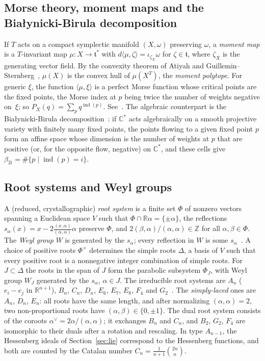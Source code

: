 \documentclass[11pt,a4paper]{article}
\numberwithin{equation}{section}
\theoremstyle{plain}
\theoremstyle{definition}
\theoremstyle{remark}
\newcommand{\R}{\mathbb{R}}
\newcommand{\C}{\mathbb{C}}
\newcommand{\Z}{\mathbb{Z}}
\DeclareMathOperator{\ind}{ind}
\begin{document}
\subsection{Morse theory, moment maps and the Białynicki-Birula decomposition}\label{app:morse}
If $T$ acts on a compact symplectic manifold $(X,\omega)$ preserving $\omega$, a \emph{moment map} is a $T$-invariant map $\mu\colon X\to\mathfrak t^*$ with $d\langle\mu,\zeta\rangle=\iota_{\zeta_X}\omega$ for $\zeta\in\mathfrak t$, where $\zeta_X$ is the generating vector field. By the convexity theorem of Atiyah and Guillemin--Sternberg~\cite{Ati82,GS82}, $\mu(X)$ is the convex hull of $\mu(X^T)$, the \emph{moment polytope}. For generic $\xi$, the function $\langle\mu,\xi\rangle$ is a perfect Morse function whose critical points are the fixed points, the Morse index at $p$ being twice the number of weights negative on~$\xi$; so $P_X(q)=\sum_pq^{\ind(p)}$. See~\cite{CdS01}. The algebraic counterpart is the Białynicki-Birula decomposition~\cite{BB73,Car02}: if $\C^*$ acts algebraically on a smooth projective variety with finitely many fixed points, the points flowing to a given fixed point $p$ form an affine space whose dimension is the number of weights at $p$ that are positive (or, for the opposite flow, negative) on $\C^*$, and these cells give $\beta_{2i}=\#\{p\mid\ind(p)=i\}$.

\subsection{Root systems and Weyl groups}\label{app:roots}
A (reduced, crystallographic) \emph{root system} is a finite set $\Phi$ of nonzero vectors spanning a Euclidean space $V$ such that $\Phi\cap\R\alpha=\{\pm\alpha\}$, the reflections $s_\alpha(x)=x-2\frac{(x,\alpha)}{(\alpha,\alpha)}\alpha$ preserve $\Phi$, and $2(\beta,\alpha)/(\alpha,\alpha)\in\Z$ for all $\alpha,\beta\in\Phi$. The \emph{Weyl group} $W$ is generated by the $s_\alpha$; every reflection in $W$ is some $s_\alpha$~\cite[§1.14]{Hum90}. A choice of positive roots $\Phi^+$ determines the simple roots $\Delta$, a basis of $V$ such that every positive root is a nonnegative integer combination of simple roots. For $J\subset\Delta$ the roots in the span of $J$ form the parabolic subsystem $\Phi_J$, with Weyl group $W_J$ generated by the $s_\alpha$, $\alpha\in J$. The irreducible root systems are $A_n$ ($e_i-e_j$ in $\R^{n+1}$), $B_n$, $C_n$, $D_n$, $E_6$, $E_7$, $E_8$, $F_4$ and $G_2$~\cite{Hum90}. The \emph{simply-laced} ones are $A_n$, $D_n$, $E_n$: all roots have the same length, and after normalizing $(\alpha,\alpha)=2$, two non-proportional roots have $(\alpha,\beta)\in\{0,\pm1\}$. The dual root system consists of the coroots $\alpha^\vee=2\alpha/(\alpha,\alpha)$; it exchanges $B_n$ and $C_n$, and $B_2$, $G_2$, $F_4$ are isomorphic to their duals after a rotation and rescaling. In type $A_{n-1}$, the Hessenberg ideals of Section~\ref{sec:lie} correspond to the Hessenberg functions, and both are counted by the Catalan number $C_n=\frac1{n+1}\binom{2n}n$.
\end{document}
